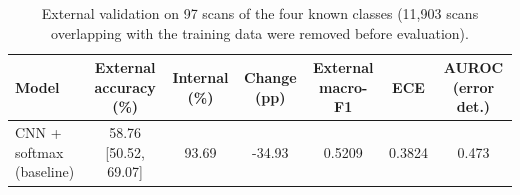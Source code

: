 \begin{table}[t]
\centering
\small
\caption{External validation on 97 scans of the four known classes (11,903 scans overlapping with the training data were removed before evaluation).}
\label{tab:external}
\begin{tabular}{lcccccc}
\toprule
Model & External accuracy (\%) & Internal (\%) & Change (pp) & External macro-F1 & ECE & AUROC (error det.) \\
\midrule
CNN + softmax (baseline) & 58.76 [50.52, 69.07] & 93.69 & -34.93 & 0.5209 & 0.3824 & 0.473 \\
\bottomrule
\end{tabular}
\end{table}